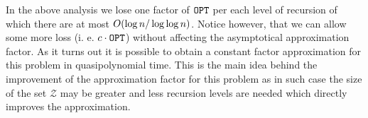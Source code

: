 In the above analysis we lose one factor of $\texttt{OPT}$ per each level of recursion of which there are at most $O\mathopen{}\left( \log n/\log\log n \right)$. Notice however, that we can allow some more loss (i. e. $c\cdot\texttt{OPT}$) without affecting the asymptotical approximation factor. As it turns out it is possible to obtain a constant factor approximation for this problem in quasipolynomial time. This is the main idea behind the improvement of the approximation factor for this problem as in such case the size of the set $\mathcal{Z}$ may be greater and less recursion levels are needed which directly improves the approximation.
